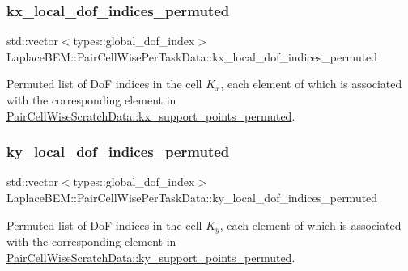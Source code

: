\subsubsection{\texorpdfstring{kx\+\_\+local\+\_\+dof\+\_\+indices\+\_\+permuted}{kx\_local\_dof\_indices\_permuted}}
{\footnotesize\ttfamily std\+::vector$<$types\+::global\+\_\+dof\+\_\+index$>$ Laplace\+B\+E\+M\+::\+Pair\+Cell\+Wise\+Per\+Task\+Data\+::kx\+\_\+local\+\_\+dof\+\_\+indices\+\_\+permuted}

Permuted list of DoF indices in the cell $K_x$, each element of which is associated with the corresponding element in {\ttfamily \hyperlink{structLaplaceBEM_1_1PairCellWiseScratchData_a32b2da930b6ad0488446e5b28da7565d}{Pair\+Cell\+Wise\+Scratch\+Data\+::kx\+\_\+support\+\_\+points\+\_\+permuted}}. \mbox{\label{structLaplaceBEM_1_1PairCellWisePerTaskData_a4ebad8073a36303fd26b67acd9a0d9b8}} 
\subsubsection{\texorpdfstring{ky\+\_\+local\+\_\+dof\+\_\+indices\+\_\+permuted}{ky\_local\_dof\_indices\_permuted}}
{\footnotesize\ttfamily std\+::vector$<$types\+::global\+\_\+dof\+\_\+index$>$ Laplace\+B\+E\+M\+::\+Pair\+Cell\+Wise\+Per\+Task\+Data\+::ky\+\_\+local\+\_\+dof\+\_\+indices\+\_\+permuted}

Permuted list of DoF indices in the cell $K_y$, each element of which is associated with the corresponding element in {\ttfamily \hyperlink{structLaplaceBEM_1_1PairCellWiseScratchData_a998570a30f2cf4069e2e08430b253ead}{Pair\+Cell\+Wise\+Scratch\+Data\+::ky\+\_\+support\+\_\+points\+\_\+permuted}}. \mbox{\label{structLaplaceBEM_1_1PairCellWisePerTaskData_aa96b7a6991e47201c7f1f6a9fdfa8680}} 
